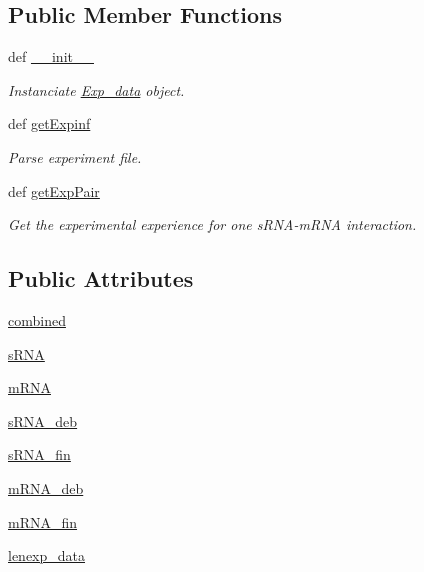 \subsection*{\-Public \-Member \-Functions}
\begin{DoxyCompactItemize}
\item 
def \hyperlink{classirna_1_1iRNA__stat_1_1Exp__data_1_1Exp__data_a2afbb326f69ef6bb311559a3963c9e90}{\-\_\-\-\_\-init\-\_\-\-\_\-}
\begin{DoxyCompactList}\small\item\em \-Instanciate \hyperlink{classirna_1_1iRNA__stat_1_1Exp__data_1_1Exp__data}{\-Exp\-\_\-data} object. \end{DoxyCompactList}\item 
def \hyperlink{classirna_1_1iRNA__stat_1_1Exp__data_1_1Exp__data_a027bb260f749590c61d44d1f663ab827}{get\-Expinf}
\begin{DoxyCompactList}\small\item\em \-Parse experiment file. \end{DoxyCompactList}\item 
def \hyperlink{classirna_1_1iRNA__stat_1_1Exp__data_1_1Exp__data_adeae8a56f829350ae1e97f4266947f1f}{get\-Exp\-Pair}
\begin{DoxyCompactList}\small\item\em \-Get the experimental experience for one s\-R\-N\-A-\/m\-R\-N\-A interaction. \end{DoxyCompactList}\end{DoxyCompactItemize}
\subsection*{\-Public \-Attributes}
\begin{DoxyCompactItemize}
\item 
\hyperlink{classirna_1_1iRNA__stat_1_1Exp__data_1_1Exp__data_a6c732303ee3ab818b3da22a304aa4abc}{combined}
\item 
\hyperlink{classirna_1_1iRNA__stat_1_1Exp__data_1_1Exp__data_abe7c7cd8422108071cc0bc9244547561}{s\-R\-N\-A}
\item 
\hyperlink{classirna_1_1iRNA__stat_1_1Exp__data_1_1Exp__data_af006e919e87309e3a8e3a9483d784e95}{m\-R\-N\-A}
\item 
\hyperlink{classirna_1_1iRNA__stat_1_1Exp__data_1_1Exp__data_a0f496de3fd640faf59aeaeb39aaa22af}{s\-R\-N\-A\-\_\-deb}
\item 
\hyperlink{classirna_1_1iRNA__stat_1_1Exp__data_1_1Exp__data_a7200b39181f34585d26f64fb34edb381}{s\-R\-N\-A\-\_\-fin}
\item 
\hyperlink{classirna_1_1iRNA__stat_1_1Exp__data_1_1Exp__data_a0260d5e39759f203e6f1a7cef316f3e1}{m\-R\-N\-A\-\_\-deb}
\item 
\hyperlink{classirna_1_1iRNA__stat_1_1Exp__data_1_1Exp__data_a12392bb9ac5af7b29c46205ea59fec2b}{m\-R\-N\-A\-\_\-fin}
\item 
\hyperlink{classirna_1_1iRNA__stat_1_1Exp__data_1_1Exp__data_ac27e47dc756a6de0bfb51801194c177c}{lenexp\-\_\-data}
\end{DoxyCompactItemize}


